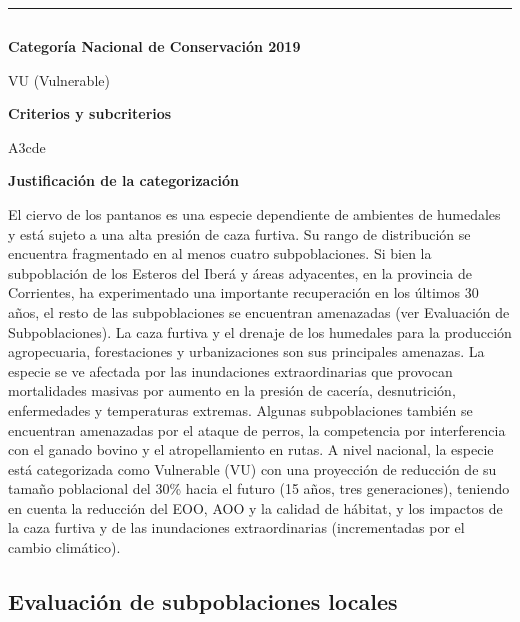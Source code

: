 \documentclass[
  x11names]{article}
\begin{document}
\begin{center}\rule{0.5\linewidth}{0.5pt}\end{center}

\newpage

\begin{table}[H]
\centering
\begin{tabular}[t]{>{\raggedright\arraybackslash}m{16cm}>{}m{16cm}}
\toprule
\cellcolor{ceil}{\textcolor{white}{\textbf{\rule{0pt}{15.5pt}CATEGORÍAS DE CONSERVACIÓN}}}\\
\bottomrule
\end{tabular}
\end{table}

\vspace{-0.4cm}

\textbf{Categoría Nacional de Conservación 2019}

VU (Vulnerable)

\textbf{Criterios y subcriterios}

A3cde

\textbf{Justificación de la categorización}

El ciervo de los pantanos es una especie dependiente de ambientes de
humedales y está sujeto a una alta presión de caza furtiva. Su rango de
distribución se encuentra fragmentado en al menos cuatro subpoblaciones.
Si bien la subpoblación de los Esteros del Iberá y áreas adyacentes, en
la provincia de Corrientes, ha experimentado una importante recuperación
en los últimos 30 años, el resto de las subpoblaciones se encuentran
amenazadas (ver Evaluación de Subpoblaciones). La caza furtiva y el
drenaje de los humedales para la producción agropecuaria, forestaciones
y urbanizaciones son sus principales amenazas. La especie se ve afectada
por las inundaciones extraordinarias que provocan mortalidades masivas
por aumento en la presión de cacería, desnutrición, enfermedades y
temperaturas extremas. Algunas subpoblaciones también se encuentran
amenazadas por el ataque de perros, la competencia por interferencia con
el ganado bovino y el atropellamiento en rutas. A nivel nacional, la
especie está categorizada como Vulnerable (VU) con una proyección de
reducción de su tamaño poblacional del 30\% hacia el futuro (15 años,
tres generaciones), teniendo en cuenta la reducción del EOO, AOO y la
calidad de hábitat, y los impactos de la caza furtiva y de las
inundaciones extraordinarias (incrementadas por el cambio climático).

\hypertarget{evaluaciuxf3n-de-subpoblaciones-locales}{%
\subsection{\texorpdfstring{\textbf{Evaluación de subpoblaciones
locales}}{Evaluación de subpoblaciones locales}}\label{evaluaciuxf3n-de-subpoblaciones-locales}}
\end{document}
